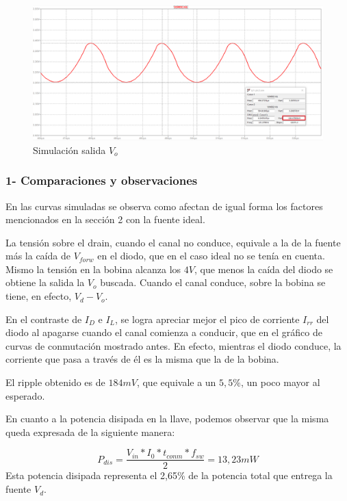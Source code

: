 \documentclass[e4_tp1_main.tex]{subfiles}
\begin{document}
\begin{figure}[H]
\centering
\includegraphics[width=1\linewidth]{Imagenes/Punto3/Vo.png}
\caption{Simulación salida $V_o$}
\end{figure}

\subsubsection*{1- Comparaciones y observaciones}

En las curvas simuladas se observa como afectan de igual forma los factores mencionados en la sección 2 con la fuente ideal.\par
La tensión sobre el drain, cuando el canal no conduce, equivale a la de la fuente más la caída de $V_{forw}$ en el diodo, que en el caso ideal no se tenía en cuenta. Mismo la tensión en la bobina alcanza los $4V$, que menos la caída del diodo se obtiene la salida la $V_o$ buscada. Cuando el canal conduce, sobre la bobina se tiene, en efecto, $V_d-V_o$.
\par
En el contraste de $I_D$ e $I_L$, se logra apreciar mejor el pico de corriente $I_{rr}$ del diodo al apagarse cuando el canal comienza a conducir, que en el gráfico de curvas de conmutación mostrado antes. En efecto, mientras el diodo conduce, la corriente que pasa a través de él es la misma que la de la bobina.
\par
El ripple obtenido es de $184mV$, que equivale a un $5,5\%$, un poco mayor al esperado.
\par
En cuanto a la potencia disipada en la llave, podemos observar que la misma queda expresada de la siguiente manera:\par
\[ 
P_{dis} = \frac{V_{in}*I_0*t_{conm}*f_{sw}}{2} = 13,23 mW  \] 
Esta potencia disipada representa el 2,65\% de la potencia total que entrega la fuente $V_d$.

\newpage
\end{document}
